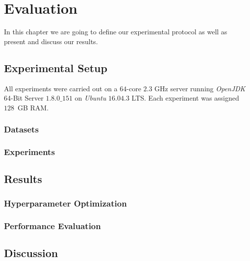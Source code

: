 \chapter{Evaluation}
\label{ch:eval}
In this chapter we are going to define our experimental protocol as well as present and discuss our results.
\section{Experimental Setup}
\label{sec:experimentalsetup}
All experiments were carried out on a $64$-core $2.3$ GHz server running \emph{OpenJDK} 64-Bit Server $1.8.0\_151$ on \emph{Ubuntu} $16.04.3$ LTS. 
Each experiment was assigned $128$~GB RAM.


\subsection{Datasets}
\label{ssec:datasets}
\newpage
\subsection{Experiments}
\label{ssec:experiments}
\newpage
\section{Results}
\label{sec:results}

\subsection{Hyperparameter Optimization}
\label{ssec:hpo}



\subsection{Performance Evaluation}
\label{ssec:performance}
\newpage
\section{Discussion} 
\label{sec:discussion}

%
